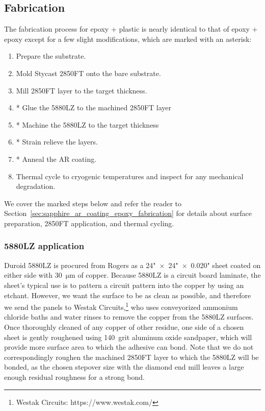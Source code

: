 \subsection{Fabrication}
\label{sec:sapphire_ar_coating_epoxy_plastic_fabrication}

The fabrication process for epoxy + plastic is nearly identical to that of epoxy + epoxy except for a few slight modifications, which are marked with an asterisk:
\begin{enumerate}
    \item Prepare the substrate.
    \item Mold Stycast 2850FT onto the bare substrate.
    \item Mill 2850FT layer to the target thickness.
    \item * Glue the 5880LZ to the machined 2850FT layer
    \item * Machine the 5880LZ to the target thickness
    \item * Strain relieve the layers.
    \item * Anneal the AR coating.
    \item Thermal cycle to cryogenic temperatures and inspect for any mechanical degradation.
\end{enumerate}
We cover the marked steps below and refer the reader to Section~\ref{sec:sapphire_ar_coating_epoxy_fabrication} for details about surface preparation, 2850FT application, and thermal cycling.


\subsubsection{5880LZ application}
\label{sec:sapphire_ar_coating_epoxy_plastic_fabrication_5880LZ_application}

Duroid 5880LZ is procured from Rogers as a 24"~$\times$~24"~$\times$~0.020" sheet coated on either side with 30~$\mathrm{\mu m}$ of copper. Because 5880LZ is a circuit board laminate, the sheet's typical use is to pattern a circuit pattern into the copper by using an etchant. However, we want the surface to be as clean as possible, and therefore we send the panels to Westak Circuits,\footnote{Westak Circuits: https://www.westak.com/} who uses conveyorized ammonium chloride baths and water rinses to remove the copper from the 5880LZ surfaces. Once thoroughly cleaned of any copper of other residue, one side of a chosen sheet is gently roughened using 140~grit aluminum oxide sandpaper, which will provide more surface area to which the adhesive can bond. Note that we do not correspondingly roughen the machined 2850FT layer to which the 5880LZ will be bonded, as the chosen stepover size with the diamond end mill leaves a large enough residual roughness for a strong bond.

